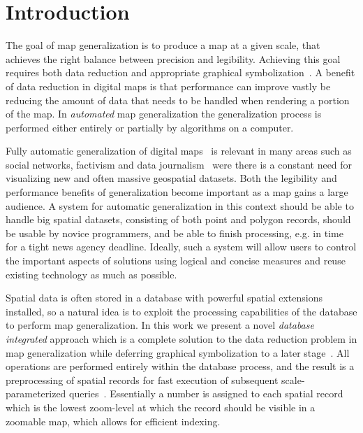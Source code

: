 \section{Introduction}





The goal of map generalization is to produce a map at a given scale, that achieves the right balance between precision and legibility. Achieving this goal requires both data reduction and appropriate graphical symbolization~\cite{brassel1988generalization,gruenreich1985cag}. A benefit of data reduction in digital maps is that performance can improve vastly be reducing the amount of data that needs to be handled when rendering a portion of the map. In \emph{automated} map generalization the generalization process is performed either entirely or partially by algorithms on a computer.

Fully automatic generalization of digital maps~\cite{nutanong2012multiresolution,sarma2012fusiontables} is relevant in many areas such as social networks, factivism and data journalism~\cite{cohen2011journalism,bono,sankaranarayanan2009twitterstand} were there is a constant need for visualizing new and often massive geospatial datasets. Both the legibility and performance benefits of generalization become important as a map gains a large audience. A system for automatic generalization in this context should be able to handle big spatial datasets, consisting of both point and polygon records, should be usable by novice programmers, and be able to finish processing, e.g. in time for a tight news agency deadline. Ideally, such a system will allow users to control the important aspects of solutions using logical and concise measures and reuse existing technology as much as possible.

Spatial data is often stored in a database with powerful spatial extensions installed, so a natural idea is to exploit the processing capabilities of the database to perform map generalization. In this work we present a novel \emph{database integrated} approach which is a complete solution to the data reduction problem in map generalization while deferring graphical symbolization to a later stage~\cite{gaffuri12vectortiles}. All operations are performed entirely within the database process, and the result is a preprocessing of spatial records for fast execution of subsequent scale-parameterized queries~\cite{hilbert1891ueber}. Essentially a number is assigned to each spatial record which is the lowest zoom-level at which the record should be visible in a zoomable map, which allows for efficient indexing.

